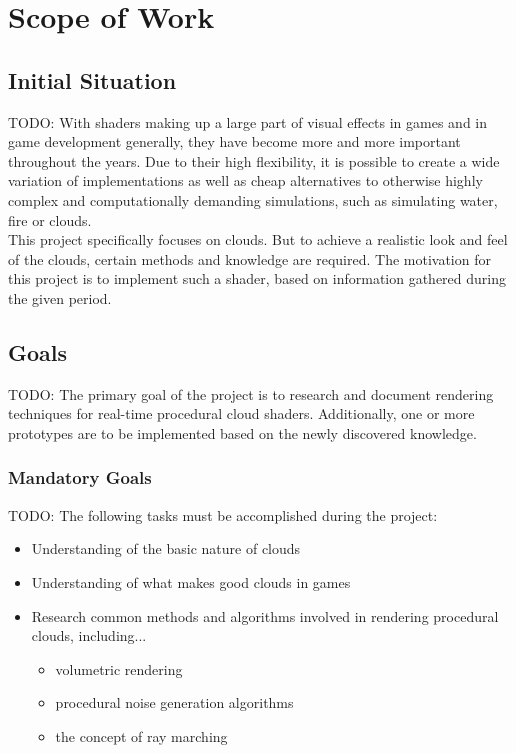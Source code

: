 \section{Scope of Work}

\subsection{Initial Situation}
\color{orange}
TODO: With shaders making up a large part of visual effects in games and in game development generally, they have become more and more important throughout the years. Due to their high flexibility, it is possible to create a wide variation of implementations as well as cheap alternatives to otherwise highly complex and computationally demanding simulations, such as simulating water, fire or clouds.
\\ This project specifically focuses on clouds. But to achieve a realistic look and feel of the clouds, certain methods and knowledge are required. The motivation for this project is to implement such a shader, based on information gathered during the given period.
\color{black}

\subsection{Goals}
\label{section:goals}
\color{orange}
TODO: The primary goal of the project is to research and document rendering techniques for real-time procedural cloud shaders. Additionally, one or more prototypes are to be implemented based on the newly discovered knowledge.
\color{black}

\subsubsection{Mandatory Goals}
\color{orange}
TODO: The following tasks must be accomplished during the project:
\begin{itemize}
\item Understanding of the basic nature of clouds
\item Understanding of what makes good clouds in games
\item Research common methods and algorithms involved in rendering procedural clouds, including...
    \begin{itemize}
    \item volumetric rendering
    \item procedural noise generation algorithms
    \item the concept of ray marching
    \end{itemize}
\end{itemize}
\color{black}


